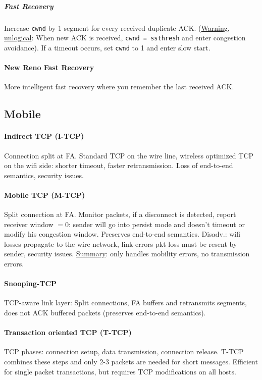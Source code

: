 \documentclass[6pt]{scrartcl}
\begin{document}
\begin{multicols}{4}
\subparagraph{Fast Recovery} Increase \texttt{cwnd} by 1 segment for every received duplicate ACK. (\underline{Warning, unlogical}: When new ACK is received, \texttt{cwnd = ssthresh} and enter congestion avoidance). If a timeout occurs, set \texttt{cwnd} to 1 and enter slow start.
\paragraph{New Reno Fast Recovery} More intelligent fast recovery where you remember the last received ACK.

\subsection{Mobile}
\paragraph{Indirect TCP (I-TCP)} Connection split at FA. Standard TCP on the wire line, wireless optimized TCP on the wifi side: shorter timeout, faster retransmission. Loss of end-to-end semantics, security issues.
\paragraph{Mobile TCP (M-TCP)} Split connection at FA. Monitor packets, if a disconnect is detected, report receiver window $= 0$: sender will go into persist mode and doesn't timeout or modify his congestion window. Preserves end-to-end semantics. Disadv.: wifi losses propagate to the wire network, link-errors pkt loss must be resent by sender, security issues. \underline{Summary}: only handles mobility errors, no transmission errors.

\paragraph{Snooping-TCP} TCP-aware link layer: Split connections, FA buffers and retransmits segments, does not ACK buffered packets (preserves end-to-end semantics).

\paragraph{Transaction oriented TCP (T-TCP)} TCP phases: connection setup, data transmission, connection release. T-TCP combines these steps and only 2-3 packets are needed for short messages. Efficient for single packet transactions, but requires TCP modifications on all hosts.


\end{multicols}
\end{document}
